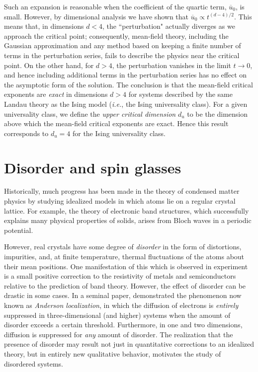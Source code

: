 Such an expansion is reasonable when the coefficient of the quartic term,
$\overline{u}_0$, is small. However, by dimensional analysis we have shown that
$\overline{u}_0 \propto t^{(d-4)/2}$. This means that, in dimensions $d<4$, the
``perturbation" actually diverges as we approach the critical point;
consequently, mean-field theory, including the Gaussian approximation and any
method based on keeping a finite number of terms in the perturbation series,
fails to describe the physics near the critical point. On the other hand, for
$d>4$, the perturbation vanishes in the limit $t \to 0$, and hence including
additional terms in the perturbation series has no effect on the asymptotic
form of the solution. The conclusion is that the mean-field critical exponents
are \emph{exact} in dimensions $d>4$ for systems described by the same Landau
theory as the Ising model (\textit{i.e.}, the Ising universality class). For a
given universality class, we define the \emph{upper critical dimension} $d_u$
to be the dimension above which the mean-field critical exponents are exact.
Hence this result corresponds to $d_u=4$ for the Ising universality class.


\section{Disorder and spin glasses}

Historically, much progress has been made in the theory of condensed matter
physics by studying idealized models in which atoms lie on a regular crystal
lattice. For example, the theory of electronic band structures, which
successfully explains many physical properties of solids, arises from Bloch
waves in a periodic potential.

However, real crystals have some degree of \emph{disorder} in the form of
distortions, impurities, and, at finite temperature, thermal fluctuations of
the atoms about their mean positions. One manifestation of this which is
observed in experiment is a small positive correction to the resistivity of
metals and semiconductors relative to the prediction of band theory. However,
the effect of disorder can be drastic in some cases. In a seminal paper,
\textcite{anderson1958absence} demonstrated the phenomenon now known as
\emph{Anderson localization}, in which the diffusion of electrons is
\emph{entirely} suppressed in three-dimensional (and higher) systems when the
amount of disorder exceeds a certain threshold. Furthermore, in one and two
dimensions, diffusion is suppressed for \emph{any} amount of disorder. The
realization that the presence of disorder may result not just in quantitative
corrections to an idealized theory, but in entirely new qualitative behavior,
motivates the study of disordered systems.

